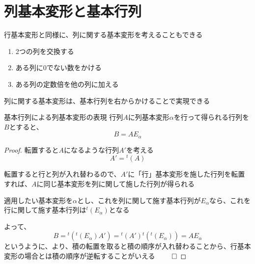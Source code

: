 \documentclass[../../../topic_linear-algebra]{subfiles}
\begin{document}
\sectionline
\section{列基本変形と基本行列}

行基本変形と同様に、列に関する基本変形を考えることもできる

\begin{enumerate}[label=\romanlabel]
  \item 2つの列を交換する
  \item ある列に0でない数をかける
  \item ある列の定数倍を他の列に加える
\end{enumerate}

列に関する基本変形は、基本行列を右からかけることで実現できる

\begin{theorem*}{基本行列による列基本変形の表現}
  行列$A$に列基本変形$\alpha$を行って得られる行列を$B$とすると、
  \begin{equation*}
    B = A E_\alpha
  \end{equation*}
\end{theorem*}

\begin{proof}
  転置すると$A$になるような行列$A'$を考える
  \begin{equation*}
    A' = {}^t(A)
  \end{equation*}

  転置すると行と列が入れ替わるので、$A'$に「行」基本変形を施した行列を転置すれば、$A$に同じ基本変形を列に関して施した行列が得られる

  \br

  適用したい基本変形を$\alpha$とし、これを列に関して施す基本行列が$E_\alpha$なら、これを行に関して施す基本行列は${}^t(E_\alpha)$となる

  \br

  よって、
  \begin{equation*}
    B = {}^t({}^t(E_\alpha)A') = {}^t(A'){}^t({}^t(E_\alpha))  = AE_{\alpha}
  \end{equation*}
  というように、より、積の転置を取ると積の順序が入れ替わることから、行基本変形の場合とは積の順序が逆転することがいえる $\qed$
\end{proof}
\end{document}
